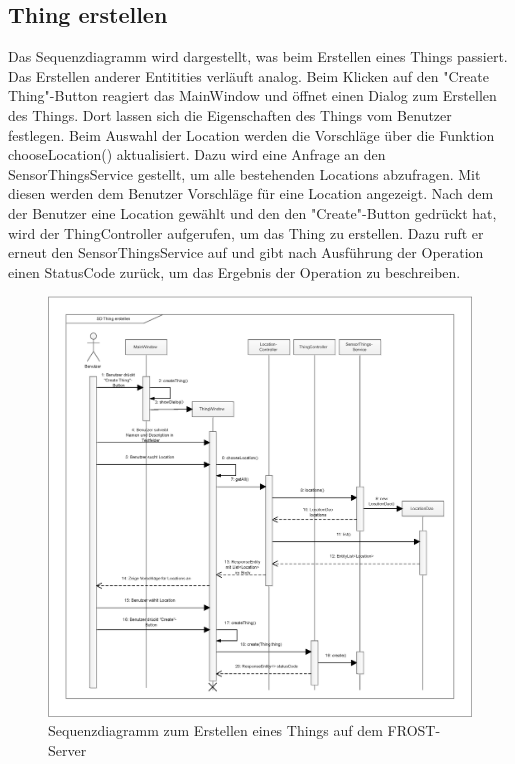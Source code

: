 \clearpage
\subsection{Thing erstellen}

Das Sequenzdiagramm wird dargestellt, was beim Erstellen eines Things passiert.
Das Erstellen anderer Entitities verläuft analog.
Beim Klicken auf den "{Create Thing}"{-Button} reagiert das MainWindow und öffnet einen Dialog zum Erstellen des Things.
Dort lassen sich die Eigenschaften des Things vom Benutzer festlegen.
Beim Auswahl der Location werden die Vorschläge über die Funktion chooseLocation() aktualisiert.
Dazu wird eine Anfrage an den SensorThingsService gestellt, um alle bestehenden Locations abzufragen.
Mit diesen werden dem Benutzer Vorschläge für eine Location angezeigt.
Nach dem der Benutzer eine Location gewählt und den den "{Create}"{-Button} gedrückt hat, wird der ThingController aufgerufen, um das Thing zu erstellen.
Dazu ruft er erneut den SensorThingsService auf und gibt nach Ausführung der Operation einen StatusCode zurück, um das Ergebnis der Operation zu beschreiben.

\begin{figure}[htbp]
\centering
\includegraphics[scale=0.4]{uml/SD_createThing.eps}
\caption{Sequenzdiagramm zum Erstellen eines Things auf dem FROST-Server}
\end{figure}

